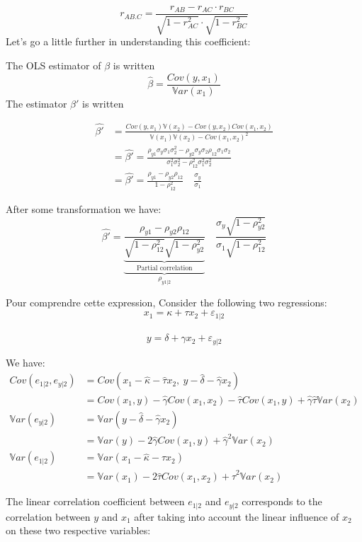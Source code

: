 \documentclass[
]{report}
\begin{document}
\[r_{AB.C}=\frac{r_{AB}-r_{AC} \cdot r_{BC}}{\sqrt{1-r_{AC}^2} \cdot \sqrt{1-r_{BC}^2}}\]
Let's go a little further in understanding this coefficient:

The OLS estimator of \(\beta\) is written
\[\hat{\beta}=\frac{Cov(y,x_1)}{\mathbb{V}ar(x_1)}\]
The estimator \(\beta'\) is written

\begin{align*}
  \hat{\beta'} &= \frac{Cov(y,x_1)\mathbb{V}(x_2)-Cov(y,x_2)Cov(x_1,x_2)}{
  \mathbb{V}(x_1)\mathbb{V}(x_2)-Cov(x_1,x_2)^2} \\
&= \hat{\beta'}=\frac{\rho_{y1} \sigma_y \sigma_1\sigma_2^2-\rho_{y2} \sigma_y     \sigma_2\rho_{12} \sigma_1 \sigma_2}{\sigma_1^2\sigma_2^2-\rho_{12}^2 \sigma_1^2 \sigma_2^2} \\
&= \hat{\beta'}={\frac{\rho_{y1}-\rho_{y2}\rho_{12}} 
{1-\rho_{12}^2}}\quad\frac{\sigma_y}{\sigma_1}
\end{align*}

After some transformation we have:
\[\hat{\beta'}=\underbrace{\underbrace{\frac{\rho_{y1}-\rho_{y2}\rho_{12}} 
{\sqrt{1-\rho_{12}^2}\sqrt{1-\rho_{y2}^2}}}_{\text{Partial correlation}}}_{\rho_{y1|2}}
\quad\frac{\sigma_y\sqrt{1-\rho_{y2}^2}}{\sigma_1\sqrt{1-\rho_{12}^2}}\]

Pour comprendre cette expression, Consider the following two regressions:
\[x_1=\kappa +\tau x_2+\varepsilon_{1|2}\]\\
\[y=\delta +\gamma x_2+\varepsilon_{y|2}\]

We have:
\begin{align*}
Cov(e_{1|2},e_{y|2})&=Cov(x_1-\hat{\kappa}-\hat{\tau} x_2,~y-\hat{\delta} -\hat{\gamma} x_2)\\
&=Cov(x_1,y)-\hat{\gamma}Cov(x_1,x_2)-\hat{\tau}Cov(x_1,y)+\hat{\gamma}\hat{\tau}\mathbb{V}ar(x_2)\\
\mathbb{V}ar(e_{y|2})&=\mathbb{V}ar(y-\hat{\delta} - \hat{\gamma} x_2)\\
&=\mathbb{V}ar(y)-2\hat{\gamma}Cov(x_1,y)+\hat{\gamma}^2\mathbb{V}ar(x_2)\\
\mathbb{V}ar(e_{1|2})&=\mathbb{V}ar(x_1-\hat{\kappa} - \hat{\tau} x_2)\\
&=\mathbb{V}ar(x_1)-2\hat{\tau}Cov(x_1,x_2)+\hat{\tau}^2\mathbb{V}ar(x_2)
\end{align*}

The linear correlation coefficient between \(e_{1|2}\) and \(e_{y|2}\) corresponds to the correlation between \(y\) and \(x_1\) after taking into account the linear influence of \(x_2\) on these two respective variables:
\end{document}
